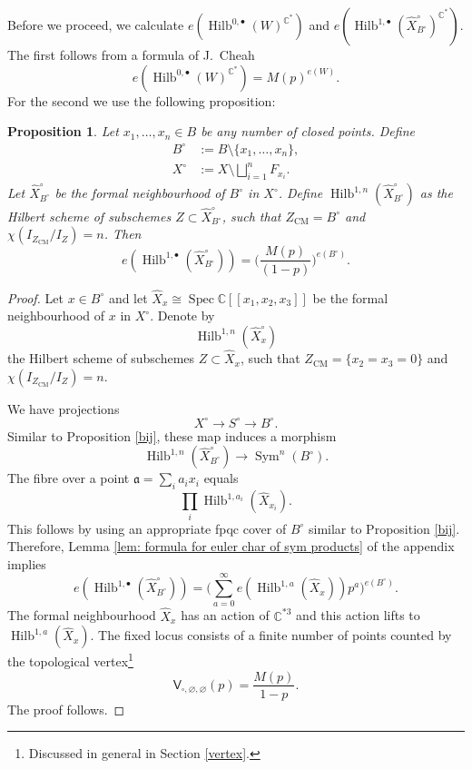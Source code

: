 \documentclass{amsart}
\newtheorem{proposition}[theorem]{Proposition}
\theoremstyle{definition}
\newcommand{\CC} {\mathbb{C}}          %
\newcommand{\sfV}{\mathsf{V}}
\newcommand{\Sym}{\operatorname{Sym}}
\newcommand{\Hilb}{\operatorname{Hilb}}
\newcommand{\CM}{\operatorname{CM}}
\newcommand{\Spec}{\operatorname{Spec}}
\begin{document}
Before we proceed, we calculate $e(\Hilb^{0,\bullet}(W)^{\CC^*})$ and $e(\Hilb^{1,\bullet}(\widehat{X}^{\circ}_{B^{\circ}})^{\CC^*})$. The first follows from a formula of J.~Cheah \cite{Che} 
\begin{equation} \label{Cheah}
e(\Hilb^{0,\bullet}(W)^{\CC^*}) = M(p)^{e(W)}.
\end{equation}
For the second we use the following proposition:
\begin{proposition} \label{section}
Let $x_1, \ldots, x_n \in B$ be any number of closed points. Define 
\begin{align*}
B^\circ &:= B \setminus \{x_1, \ldots, x_n\}, \\
X^\circ &:= X \setminus \bigsqcup_{i=1}^{n} F_{x_i}.
\end{align*} 
Let $\widehat{X}^{\circ}_{B^{\circ}}$ be the formal neighbourhood of $B^\circ$ in $X^\circ$. Define $\Hilb^{1,n}(\widehat{X}^{\circ}_{B^{\circ}})$ as the Hilbert scheme of subschemes $Z \subset \widehat{X}^{\circ}_{B^{\circ}}$, such that $Z_{\CM} = B^\circ$ and $\chi(I_{Z_{\CM}} / I_Z) = n$.
Then
$$
e(\Hilb^{1,\bullet}(\widehat{X}^{\circ}_{B^{\circ}})) = \Bigg( \frac{M(p)}{(1-p)} \Bigg)^{e(B^\circ)}.
$$
\end{proposition}
\begin{proof}
Let $x \in B^\circ$ and let $\widehat{X}_{x} \cong \Spec \CC [\![x_1,x_2,x_3]\!]$ be the formal neighbourhood of $x$ in $X^\circ$. Denote by $$\Hilb^{1,n}(\widehat{X}^{\circ}_{x})$$ the Hilbert scheme of subschemes $Z \subset \widehat{X}_{x}$, such that $Z_{\CM} = \{x_2=x_3=0\}$ and $\chi(I_{Z_{\CM}} / I_Z) = n$. 

We have projections
$$
X^\circ \longrightarrow S^\circ \longrightarrow B^\circ.
$$
Similar to Proposition \ref{bij}, these map induces a morphism
$$
\Hilb^{1,n}(\widehat{X}^{\circ}_{B^{\circ}}) \longrightarrow \Sym^n(B^\circ).
$$
The fibre over a point $\mathfrak{a} = \sum_i a_i x_i$ equals
$$
\prod_{i} \Hilb^{1,a_i}(\widehat{X}_{x_i}).
$$
This follows by using an appropriate fpqc cover of $B^\circ$ similar to Proposition \ref{bij}. Therefore, Lemma \ref{lem: formula for euler char of sym products} of the appendix implies
$$
e(\Hilb^{1,\bullet}(\widehat{X}^{\circ}_{B^{\circ}})) = \Bigg( \sum_{a=0}^{\infty} e(\Hilb^{1,a}(\widehat{X}_{x})) p^a \Bigg)^{e(B^\circ)}.
$$
The formal neighbourhood $\widehat{X}_{x}$ has an action of $\CC^{*3}$ and this action lifts to $\Hilb^{1,a}(\widehat{X}_{x})$. The fixed locus consists of a finite number of points counted by the topological vertex\footnote{Discussed in general in Section \ref{vertex}.}
$$
\sfV_{\square,\varnothing,\varnothing}(p) = \frac{M(p)}{1-p}.
$$
The proof follows.
\end{proof}
\end{document}
